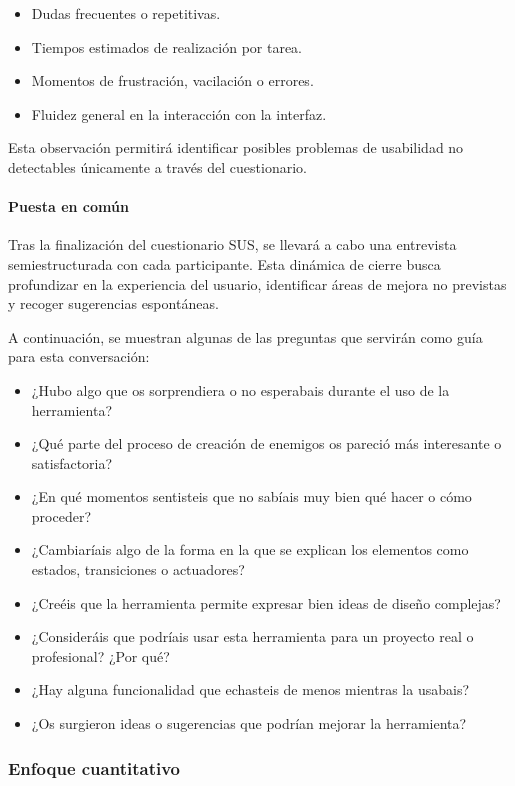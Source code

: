 \begin{itemize}
\item Dudas frecuentes o repetitivas.
\item Tiempos estimados de realización por tarea.
\item Momentos de frustración, vacilación o errores.
\item Fluidez general en la interacción con la interfaz.
\end{itemize}

Esta observación permitirá identificar posibles problemas de usabilidad no detectables únicamente a través del cuestionario.

\paragraph{Puesta en común}
Tras la finalización del cuestionario SUS, se llevará a cabo una entrevista semiestructurada con cada participante. Esta dinámica de cierre busca profundizar en la experiencia del usuario, identificar áreas de mejora no previstas y recoger sugerencias espontáneas. 

A continuación, se muestran algunas de las preguntas que servirán como guía para esta conversación:

\begin{itemize}
\item ¿Hubo algo que os sorprendiera o no esperabais durante el uso de la herramienta?
\item ¿Qué parte del proceso de creación de enemigos os pareció más interesante o satisfactoria?
\item ¿En qué momentos sentisteis que no sabíais muy bien qué hacer o cómo proceder?
\item ¿Cambiaríais algo de la forma en la que se explican los elementos como estados, transiciones o actuadores?
\item ¿Creéis que la herramienta permite expresar bien ideas de diseño complejas?
\item ¿Consideráis que podríais usar esta herramienta para un proyecto real o profesional? ¿Por qué?
\item ¿Hay alguna funcionalidad que echasteis de menos mientras la usabais?
\item ¿Os surgieron ideas o sugerencias que podrían mejorar la herramienta?
\end{itemize}

\subsubsection{Enfoque cuantitativo}

